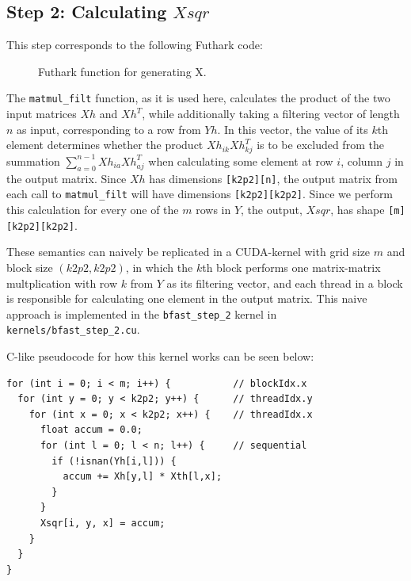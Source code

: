 \subsection{
  Step 2: Calculating \(Xsqr\)
}
This step corresponds to the following Futhark code:
\begin{figure}[H]
    \centering
    \caption{Futhark function for generating X.}
    \label{fut:kernel2}
\end{figure}

The \texttt{matmul\_filt} function, as it is used here, calculates the product
of the two input matrices \(Xh\) and \(Xh^T\), while additionally taking a
filtering vector of length \(n\) as input, corresponding to a row from \(Yh\).
In this vector, the value of its \(k\)th element determines whether the product
\(Xh_{ik}Xh^T_{kj}\) is to be excluded from the summation
\(\sum\limits_{a=0}^{n-1} Xh_{ia}Xh^T_{aj}\) when calculating some element
at row \(i\), column \(j\) in the output matrix.
Since \(Xh\) has dimensions \texttt{[k2p2][n]}, the output matrix from each call
to \texttt{matmul\_filt} will have dimensions \texttt{[k2p2][k2p2]}.
Since we perform this calculation for every one of the \(m\) rows in \(Y\), the
output, \(Xsqr\), has shape \texttt{[m][k2p2][k2p2]}.

These semantics can naively be replicated in a CUDA-kernel with grid size \(m\)
and block size \( (k2p2, k2p2)\), in which the \(k\)th block performs one
matrix-matrix multplication with row \(k\) from \(Y\) as its filtering vector,
and each thread in a block is responsible for calculating one element in the
output matrix.
This naive approach is implemented in the \texttt{bfast\_step\_2} kernel in
\texttt{kernels/bfast\_step\_2.cu}.

C-like pseudocode for how this kernel works can be seen below:
\begin{verbatim}
for (int i = 0; i < m; i++) {           // blockIdx.x
  for (int y = 0; y < k2p2; y++) {      // threadIdx.y
    for (int x = 0; x < k2p2; x++) {    // threadIdx.x
      float accum = 0.0;
      for (int l = 0; l < n; l++) {     // sequential
        if (!isnan(Yh[i,l])) {
          accum += Xh[y,l] * Xth[l,x];
        }
      }
      Xsqr[i, y, x] = accum;
    }
  }
}
\end{verbatim}


